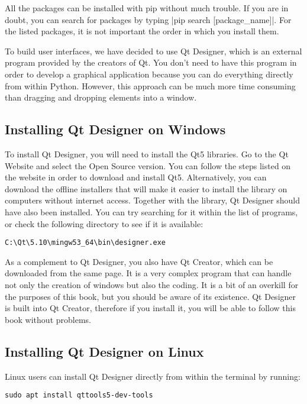 All the packages can be installed with pip without much trouble. If you are in doubt, you can search for packages by typing |pip search [package_name]|. For the listed packages, it is not important the order in which you install them.

To build user interfaces, we have decided to use Qt Designer, which is an external program provided by the creators of Qt. You don’t need to have this program in order to develop a graphical application because you can do everything directly from within Python. However, this approach can be much more time consuming than dragging and dropping elements into a window.

\subsection{Installing Qt Designer on Windows}

To install Qt Designer, you will need to install the Qt5 libraries. Go to the Qt Website and select the Open Source version. You can follow the steps listed on the website in order to download and install Qt5. Alternatively, you can download the offline installers that will make it easier to install the library on computers without internet access. Together with the library, Qt Designer should have also been installed. You can try searching for it within the list of programs, or check the following directory to see if it is available:

\begin{verbatim}
C:\Qt\5.10\mingw53_64\bin\designer.exe
\end{verbatim}

As a complement to Qt Designer, you also have Qt Creator, which can be downloaded from the same page. It is a very complex program that can handle not only the creation of windows but also the coding. It is a bit of an overkill for the purposes of this book, but you should be aware of its existence. Qt Designer is built into Qt Creator, therefore if you install it, you will be able to follow this book without problems.

\subsection{Installing Qt Designer on Linux}

Linux users can install Qt Designer directly from within the terminal by running:

\begin{verbatim}
sudo apt install qttools5-dev-tools
\end{verbatim}


